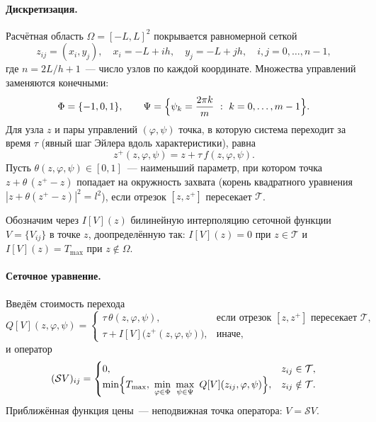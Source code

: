 \documentclass[14pt,a4paper]{extarticle}
\newcommand{\Tmax}{T_{\max}}
\begin{document}
\paragraph{Дискретизация.}
Расчётная область $\Omega=[-L,L]^2$ покрывается равномерной сеткой
\[
	z_{ij}=(x_i,y_j),\quad x_i=-L+ih,\quad y_j=-L+jh,\quad i,j=0,\dots,n-1,
\]
где $n=2L/h+1$~--- число узлов по каждой координате.
Множества управлений заменяются конечными:
\[
	\Phi=\{-1,0,1\},\qquad
	\Psi=\Bigl\{\psi_k=\frac{2\pi k}{m}\ :\ k=0,\dots,m-1\Bigr\}.
\]
Для узла $z$ и пары управлений $(\varphi,\psi)$ точка, в которую система
переходит за время $\tau$ (явный шаг Эйлера вдоль характеристики), равна
\begin{equation}\label{eq:foot}
	z^{+}(z,\varphi,\psi) = z + \tau\, f(z,\varphi,\psi).
\end{equation}
Пусть $\theta(z,\varphi,\psi)\in[0,1]$~--- наименьший параметр, при котором
точка $z+\theta\,(z^{+}-z)$ попадает на окружность захвата
(корень квадратного уравнения $|z+\theta(z^{+}-z)|^2=l^2$),
если отрезок $[z,z^{+}]$ пересекает $\mathcal{T}$.

Обозначим через $I[V](z)$ билинейную интерполяцию сеточной функции
$V=\{V_{ij}\}$ в точке $z$, доопределённую так: $I[V](z)=0$ при
$z\in\mathcal{T}$ и $I[V](z)=\Tmax$ при $z\notin\Omega$.

\paragraph{Сеточное уравнение.}
Введём стоимость перехода
\begin{equation}\label{eq:cand}
	Q[V](z,\varphi,\psi)=
	\begin{cases}
		\tau\,\theta(z,\varphi,\psi), & \text{если отрезок } [z,z^{+}] \text{ пересекает } \mathcal{T},\\[2pt]
		\tau + I[V]\bigl(z^{+}(z,\varphi,\psi)\bigr), & \text{иначе,}
	\end{cases}
\end{equation}
и оператор
\begin{equation}\label{eq:op}
	(\mathcal{S}V)_{ij} =
	\begin{cases}
		0, & z_{ij}\in\mathcal{T},\\
		\min\Bigl\{\Tmax,\ \min\limits_{\varphi\in\Phi}\ \max\limits_{\psi\in\Psi}\ Q[V](z_{ij},\varphi,\psi)\Bigr\}, & z_{ij}\notin\mathcal{T}.
	\end{cases}
\end{equation}
Приближённая функция цены~--- неподвижная точка оператора: $V=\mathcal{S}V$.
\end{document}
